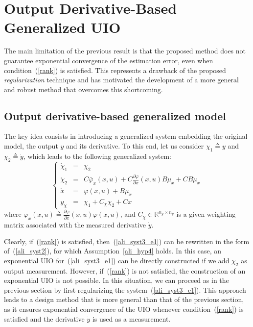 \documentclass{ifacconf}
\def\eqref#1{(\ref{#1})}
\begin{document}
{\color{black}
\section{Output Derivative-Based Generalized UIO}\label{output_derivative}
The main limitation of the previous result is that the proposed method does not guarantee exponential convergence of the estimation error, even when condition~\eqref{rank} is satisfied. This represents a drawback of the proposed {\it regularization} technique and has motivated the development of a more general and robust method that overcomes this shortcoming.

\subsection{Output derivative-based generalized model}\label{output_derivative_model}
The key idea consists in introducing a generalized system embedding the original model, the output $y$ and its derivative. To this end, let us consider $\chi_{1} \triangleq y$ and $\chi_{2} \triangleq \dot{y}$, which leads to the following generalized system:
\begin{equation}\label{ali_syst3_e1}
\left\{
\begin{array}{rcl}
\dot{\chi}_{1} & = & \chi_{2} 
\\
\dot{\chi}_{2} & = & C  \bar{\varphi}_{x}(x,u)  + C \frac{\partial \varphi}{\partial x}(x,u) B \mu_{x} + CB \dot{\mu}_{x}
\\ 
\dot{x} & = &  \varphi(x,u) + B \mu_{x} \\
y_{\chi} & = &  \chi_{1} + C_{\chi} \chi_{2} + C x
\end{array}
\right.
\end{equation}
where $\bar{\varphi}_{x}(x,u) \triangleq \frac{\partial \varphi}{\partial x}(x,u) \varphi(x,u)$, and $C_{\chi} \in\mathbb{R}^{n_y\times n_y}$ is a given weighting matrix associated with the measured derivative $\dot{y}$.

Clearly, if~\eqref{rank} is satisfied, then~\eqref{ali_syst3_e1} can be rewritten in the form of~\eqref{ali_syst2}, for which Assumption~\ref{ali_hyp4} holds. In this case, an exponential UIO for~\eqref{ali_syst3_e1} can be directly constructed if we add $\chi_{2}$ as output measurement. However, if~\eqref{rank} is not satisfied, the construction of an exponential UIO is not possible. In this situation, we can proceed as in the previous section by first regularizing the system~\eqref{ali_syst3_e1}. This approach leads to a design method that is more general than that of the previous section, as it ensures exponential convergence of the UIO whenever condition~\eqref{rank} is satisfied and the derivative $\dot{y}$ is used as a measurement.


}
\end{document}
